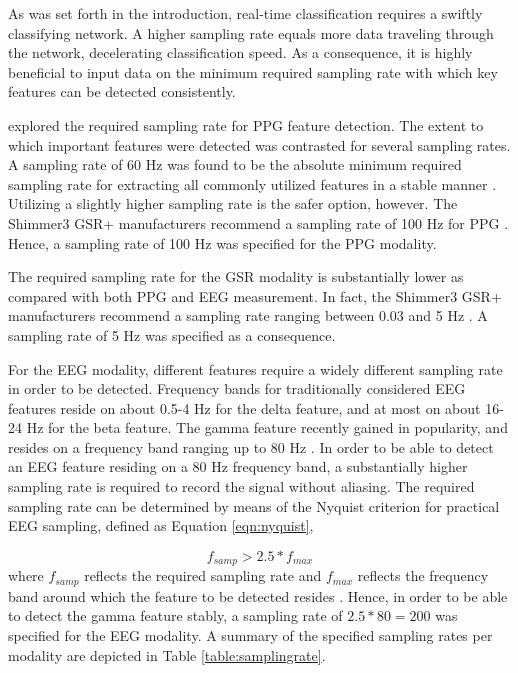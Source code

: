 \documentclass[12pt]{article}
\begin{document}
As was set forth in the introduction, real-time classification requires a swiftly classifying network. A higher sampling rate equals more data traveling through the network, decelerating classification speed. As a consequence, it is highly beneficial to input data on the minimum required sampling rate with which key features can be detected consistently.

 explored the required sampling rate for PPG feature detection. The extent to which important features were detected was contrasted for several sampling rates. A sampling rate of 60 Hz was found to be the absolute minimum required sampling rate for extracting all commonly utilized features in a stable manner \cite{fujita2019evaluation}. Utilizing a slightly higher sampling rate is the safer option, however. The Shimmer3 GSR+ manufacturers recommend a sampling rate of 100 Hz for PPG \cite{shimmer}. Hence, a sampling rate of 100 Hz was specified for the PPG modality. 

The required sampling rate for the GSR modality is substantially lower as compared with both PPG and EEG measurement. In fact, the Shimmer3 GSR+ manufacturers recommend a sampling rate ranging between 0.03 and 5 Hz \cite{shimmer}. A sampling rate of 5 Hz was specified as a consequence. 

For the EEG modality, different features require a widely different sampling rate in order to be detected. Frequency bands for traditionally considered EEG features reside on about 0.5-4 Hz for the delta feature, and at most on about 16-24 Hz for the beta feature. The gamma feature recently gained in popularity, and resides on a frequency band ranging up to 80 Hz \cite{weiergraeber2016sampling}. In order to be able to detect an EEG feature residing on a 80 Hz frequency band, a substantially higher sampling rate is required to record the signal without aliasing. The required sampling rate can be determined by means of the Nyquist criterion for practical EEG sampling, defined as Equation \ref{eqn:nyquist},

\begin{equation}
\label{eqn:nyquist}
f_{samp} > 2.5 * f_{max}
\end{equation}
where $f_{samp}$ reflects the required sampling rate and $f_{max}$ reflects the frequency band around which the feature to be detected resides \cite{srinivasan1998estimating}. Hence, in order to be able to detect the gamma feature stably, a sampling rate of $2.5*80=200$ was specified for the EEG modality. A summary of the specified sampling rates per modality are depicted in Table \ref{table:samplingrate}.
\end{document}
